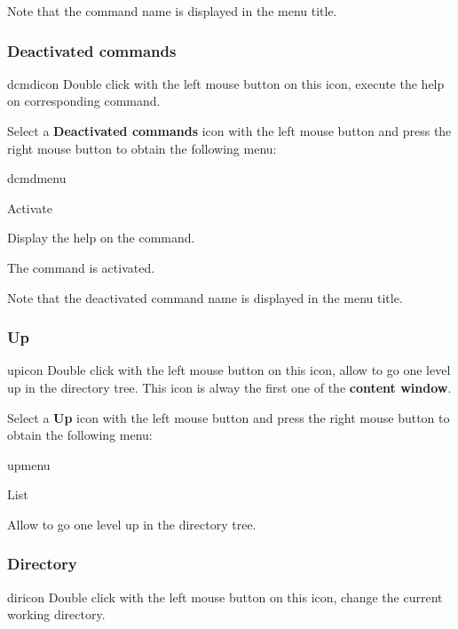 Note that the command name is displayed in the menu title.


\subsubsection{Deactivated \XPAW{} commands}
\begin{ICON}{dcmdicon}
Double click with the left mouse button on this icon, execute the help on
corresponding \XPAW{} command.
\end{ICON}

Select a {\bf Deactivated \XPAW{} commands} icon with the left mouse button
and press the right mouse button to obtain the following menu:

\begin{PAWf}{dcmdmenu}
\begin{DLsf}{Activate}
\item[Help]         Display the help on the command.
\item[Activate]     The command is activated.
\end{DLsf}
\end{PAWf}

Note that the deactivated command name is displayed in the menu title.

\subsubsection{Up}
\begin{ICON}{upicon}
Double click with the left mouse button on this icon, allow to go one level up
in the directory tree. This icon is alway the first one of the {\bf content
window}.
\end{ICON}

Select a {\bf Up} icon with the left mouse button and press
the right mouse button to obtain the following menu:

\begin{PAWf}{upmenu}
\begin{DLsf}{List}
\item[List]         Allow to go one level up in the directory tree.
\end{DLsf}
\end{PAWf}

\subsubsection{Directory}
\begin{ICON}{diricon}
Double click with the left mouse button on this icon, change the current
working directory.
\end{ICON}

